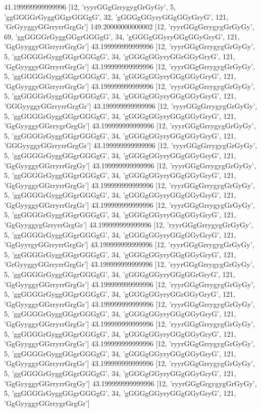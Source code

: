 41.199999999999996 [12, 'ryyrGGgGrrygygGrGyGy', 5, 'ggGGGGrGyggGGgrGGGgG', 32, 'gGGGgGGyryGGgGGyGryG', 121, 'GrGyyggyGGrryrrGrgGr']
149.20000000000002 [12, 'ryyrGGgGrrygygGrGyGy', 69, 'ggGGGGrGyggGGgrGGGgG', 34, 'gGGGgGGyryGGgGGyGryG', 121, 'GgGyyggyGGrryrrGrgGr']
43.199999999999996 [12, 'ryyrGGgGrrygygGrGyGy', 5, 'ggGGGGrGyggGGgrGGGgG', 34, 'gGGGgGGyryGGrGGyGryG', 121, 'GgGyyggyGGrryrrGrgGr']
43.199999999999996 [12, 'ryyrGGgGrrygygGrGyGy', 5, 'ggGGGGrGyggGGgrGGGgG', 34, 'gGGGgGGyryGGgGGyGryG', 121, 'GgGyyggyGGrryrrGrgGr']
43.199999999999996 [12, 'ryyrGGgGrrygygGrGyGy', 5, 'ggGGGGrGyggGGgrGGGgG', 34, 'gGGGgGGyryGGgGGyGryG', 121, 'GGGyyggyGGrryrrGrgGr']
43.199999999999996 [12, 'ryyrGGgGrrygygGrGyGy', 5, 'ggGGGGrGyggGGgrGGGgG', 34, 'gGGGgGGyryGGgGGyGryG', 121, 'GgGyyggyGGrrygrGrgGr']
43.199999999999996 [12, 'ryyrGGgGrrygygGrGyGy', 5, 'ggGGGGrGyggGGgrGGGgG', 34, 'gGGGgGGyryGGgGGyGryG', 121, 'GGGyyggyGGrryrrGrgGr']
43.199999999999996 [12, 'ryyrGGgGrrygygGrGyGy', 5, 'ggGGGGrGyggGGgrGGGgG', 34, 'gGGGgGGyryGGgGGyGryG', 121, 'GgGyyggyGGrryrrGrgGy']
43.199999999999996 [12, 'ryyrGGgGrrygygGrGyGy', 5, 'ggGGGGrGyggGGgrGGGgG', 34, 'gGGGgGGyryGGgGGyGryG', 121, 'GgGyyggyGGrryrrGrgGr']
43.199999999999996 [12, 'ryyrGGgGrrygygGrGyGy', 5, 'ggGGGGrGyggGGgrGGGgG', 34, 'gGGGgGGyryGGgGGyGryG', 121, 'GgGyyggyGGrryrrGrgGr']
43.199999999999996 [12, 'ryyrGGgGrrygygGrGyGy', 5, 'ggGGGGrGyggGGgrGGGgG', 34, 'gGGGgGGyryGGgGGyGryG', 121, 'GgGyyggygGrryrrGrgGr']
43.199999999999996 [12, 'ryyrGGgGrrygygGrGyGy', 5, 'ggGGGGrGyggGGgrGGGgG', 34, 'gGGGgGGyryGGgGGyGryG', 121, 'GgGyyrgyGGrryrrGrgGr']
43.199999999999996 [12, 'ryyrGGgGrrygygGrGyGy', 5, 'ggGGGGrGyggGGgrGGGgG', 34, 'gGGGgGGyryGGgGGyGryG', 121, 'GrGyyggyGGrryrrGrgGr']
43.199999999999996 [12, 'ryyrGGgGrrygygGrGyGy', 5, 'ggGGGGrGyggGGgrGGGgG', 34, 'gGGGgGGyryGGgGGrGryG', 121, 'GgGyyggyGGrryrrGrgGr']
43.199999999999996 [12, 'ryyrGGgGrrygygGrGyGy', 5, 'ggGGGGrGyggGGgrGGGgG', 34, 'gGGGgGGyryGGrGGyGryG', 121, 'GgGyyggyGGrryrrGrgGr']
43.199999999999996 [12, 'ryyrGGgGrrygygGrGyGy', 5, 'ggGGGGrGyggGGgrGGGgG', 34, 'gGGGgGGyryGGgGGyGryG', 121, 'GgGyyggyGGrryrrGrgGr']
43.199999999999996 [12, 'ryyrGGgGrrygygGrGyGy', 5, 'ggGGGGrGyggGGgrGGGgG', 34, 'gGGGgGGyryGGgGGyGryG', 121, 'GgGyyggyGGrryrrGrgGr']
43.199999999999996 [12, 'ryyrGGgGrrygygGrGyGy', 5, 'ggGGGGrGyggGGgrGGGgG', 34, 'gGGGgGGyryGGgGGyGryG', 121, 'GgGyyggyGGrryrrGrgGr']
43.199999999999996 [12, 'ryyrGGgGrrygygGrGyGy', 5, 'ggGGGGrGyggGGgrGGGgG', 34, 'gGGGgGGyryGGgGGyGryG', 121, 'GgGyyggyGGrryrrGrgGy']
43.199999999999996 [12, 'ryyrGGgGrgygygGrGyGy', 5, 'ggGGGGrGyggGGgrGGGgG', 34, 'gGGGgGGyryGGgGGyGryG', 121, 'GgGyyggyGGrrygrGrgGr']
